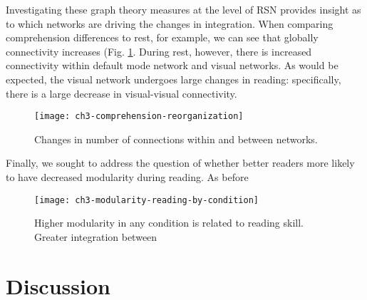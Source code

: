 

Investigating these graph theory measures at the level of RSN provides insight as to which networks are driving the changes in integration. When comparing comprehension differences to rest, for example, we can see that globally connectivity increases (Fig. \ref{fig:ch3-comprehension-reorganization}. During rest, however, there is increased connectivity within default mode network and visual networks. As would be expected, the visual network undergoes large changes in reading: specifically, there is a large decrease in visual-visual connectivity. 

\begin{figure}[t]
	\centering
	\texttt{[image: ch3-comprehension-reorganization]}
    \caption[Changes in number of connections within and between networks.]{Changes in number of connections within and between networks.}
	\label{fig:ch3-comprehension-reorganization}
\end{figure}

Finally, we sought to address the question of whether better readers more likely to have decreased modularity during reading. As before 

\begin{figure}[t]
	\centering
	\texttt{[image: ch3-modularity-reading-by-condition]}
    \caption[Higher modularity in any condition is related to reading skill.]{Higher modularity in any condition is related to reading skill. Greater integration between}
	\label{fig:ch3-modularity-reading-by-condition}
\end{figure}


\section{Discussion}

